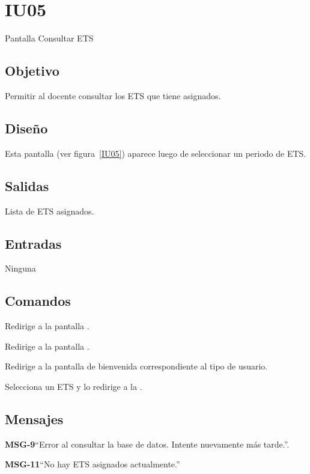 \section{IU05}{Pantalla Consultar ETS}

\subsection{Objetivo}
	Permitir al docente consultar los ETS que tiene asignados. 

\subsection{Diseño}
	Esta pantalla  (ver figura~\ref{IU05}) aparece luego de seleccionar un periodo de ETS. 


\subsection{Salidas}
	Lista de ETS asignados. 

\subsection{Entradas}
	Ninguna
	
\subsection{Comandos}
\begin{Citemize}

	\item {} Redirige a la pantalla .
	\item {} Redirige a la pantalla .
	\item {} Redirige a la pantalla de bienvenida correspondiente al tipo de usuario.
	\item {} Selecciona un ETS y lo redirige a la .
\end{Citemize}

\subsection{Mensajes}

\begin{Citemize}
	\item {\bf MSG-9}{``Error al consultar la base de datos. Intente nuevamente más tarde.''.}
	\item {\bf MSG-11}{``No hay ETS asignados actualmente.''}
\end{Citemize}

